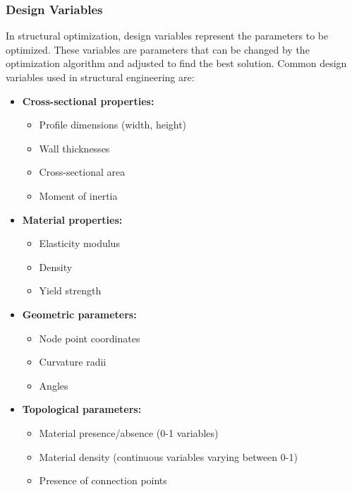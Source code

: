 
\subsubsection{Design Variables}
In structural optimization, design variables represent the parameters to be optimized. These variables are parameters that can be changed by the optimization algorithm and adjusted to find the best solution. Common design variables used in structural engineering are:

\begin{itemize}
    \item \textbf{Cross-sectional properties:} 
    \begin{itemize}
        \item Profile dimensions (width, height)
        \item Wall thicknesses
        \item Cross-sectional area
        \item Moment of inertia
    \end{itemize}
    
    \item \textbf{Material properties:} 
    \begin{itemize}
        \item Elasticity modulus
        \item Density
        \item Yield strength
    \end{itemize}
    
    \item \textbf{Geometric parameters:} 
    \begin{itemize}
        \item Node point coordinates
        \item Curvature radii
        \item Angles
    \end{itemize}
    
    \item \textbf{Topological parameters:} 
    \begin{itemize}
        \item Material presence/absence (0-1 variables)
        \item Material density (continuous variables varying between 0-1)
        \item Presence of connection points
    \end{itemize}
\end{itemize}

